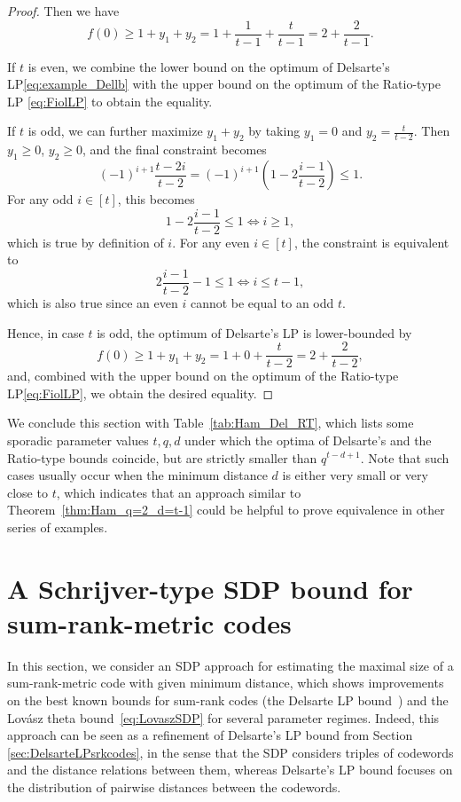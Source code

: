 \documentclass[a4paper]{article}
\begin{document}
\begin{proof}
Then we have 
\begin{equation}\label{eq:example_Dellb}
    f(0)\geq 1+y_1+y_2=1+\frac1{t-1}+\frac{t}{t-1}=2+\frac2{t-1}.
\end{equation}

If $t$ is even, we combine the lower bound on the optimum of Delsarte's LP\:\eqref{eq:example_Dellb} with the upper bound on the optimum of the Ratio-type LP \eqref{eq:FiolLP} to obtain the equality.

If $t$ is odd, we can further maximize $y_1+y_2$ by taking $y_1=0$ and $y_2=\frac{t}{t-2}.$ Then $y_1\geq0$, $y_2\geq 0$, and the final constraint becomes
$$(-1)^{i+1}\frac{t-2i}{t-2} = (-1)^{i+1} \left(1-2\frac{i-1}{t-2}\right)\leq 1.$$
For any odd $i\in[t]$, this becomes $$1-2\frac{i-1}{t-2}\leq 1\Leftrightarrow i\geq 1,$$ which is true by definition of $i$.
For any even $i\in[t]$, the constraint is equivalent to $$2\frac{i-1}{t-2}-1\leq 1\Leftrightarrow i\leq t-1,$$ which is also true since an even $i$ cannot be equal to an odd $t$.

Hence, in case $t$ is odd, the optimum of Delsarte's LP is lower-bounded by $$f(0)\geq 1+y_1+y_2=1+0+\frac{t}{t-2}=2+\frac2{t-2},$$ and, combined with the upper bound on the optimum of the Ratio-type LP\:\eqref{eq:FiolLP}, we obtain the desired equality.
\end{proof}

We conclude this section with Table~\ref{tab:Ham_Del_RT}, which lists some sporadic parameter values $t,q,d$ under which the optima of Delsarte's and the Ratio-type bounds coincide, but are strictly smaller than $q^{t-d+1}$. Note that such cases usually occur when the minimum distance $d$ is either very small or very close to $t$, which indicates that an approach similar to Theorem~\ref{thm:Ham_q=2_d=t-1} could be helpful to prove equivalence in other series of examples.

\section{A Schrijver-type SDP bound for sum-rank-metric codes}\label{sec:SchrijverSDPbound}

In this section, we consider an SDP approach for estimating the maximal size of a sum-rank-metric code with given minimum distance, which shows improvements on the best known bounds for sum-rank codes (the Delsarte LP bound~\cite{AGKP2024}) and the Lov\'asz theta bound~\eqref{eq:LovaszSDP} for several parameter regimes. Indeed, this approach can be seen as a refinement of Delsarte's LP bound from Section \ref{sec:DelsarteLPsrkcodes}, in the sense that the SDP considers triples of codewords and the distance relations between them, whereas Delsarte's LP bound focuses on the distribution of pairwise distances between the codewords.
\end{document}
